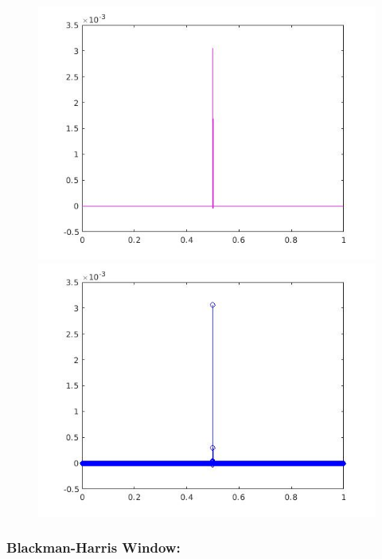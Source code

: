\documentclass[a4paper,11pt]{article}
\begin{document}
\begin{figure}[!hp]
\centering
\begin{minipage}{.5\textwidth}
  \centering
  \includegraphics[width=1\linewidth]{images/lab2_38.jpg}
\end{minipage}%
\begin{minipage}{.5\textwidth}
  \centering
  \includegraphics[width=1\linewidth]{images/lab2_39.jpg}
\end{minipage}
\end{figure}

\subsubsection{Blackman-Harris Window:}
\end{document}
